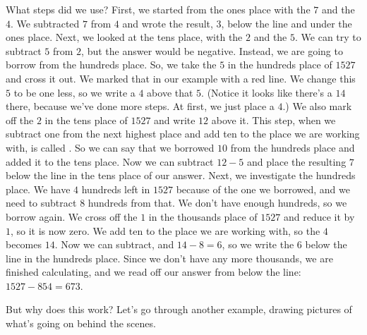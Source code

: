 \documentclass{ximera}
\begin{document}
What steps did we use? First, we started from the ones place with the $7$ and the $4$. We subtracted $7$ from $4$ and wrote the result, $3$, below the line and under the ones place. Next, we looked at the tens place, with the $2$ and the $5$. We can try to subtract $5$ from $2$, but the answer would be negative. Instead, we are going to borrow from the hundreds place. So, we take the $5$ in the hundreds place of $1527$ and cross it out. We marked that in our example with a red line. We change this $5$ to be one less, so we write a $4$ above that $5$. (Notice it looks like there's a $14$ there, because we've done more steps. At first, we just place a $4$.) We also mark off the $2$ in the tens place of $1527$ and write $12$ above it. This step, when we subtract one from the next highest place and add ten to the place we are working with, is called . So we can say that we borrowed $10$ from the hundreds place and added it to the tens place. Now we can subtract $12-5$ and place the resulting $7$ below the line in the tens place of our answer. Next, we investigate the hundreds place. We have $4$ hundreds left in $1527$ because of the one we borrowed, and we need to subtract $8$ hundreds from that. We don't have enough hundreds, so we borrow again. We cross off the $1$ in the thousands place of $1527$ and reduce it by $1$, so it is now zero. We add ten to the place we are working with, so the $4$ becomes $14$. Now we can subtract, and $14-8 = 6$, so we write the $6$ below the line in the hundreds place. Since we don't have any more thousands, we are finished calculating, and we read off our answer from below the line: $1527 - 854 = 673$.

But why does this work? Let's go through another example, drawing pictures of what's going on behind the scenes.
\end{document}
